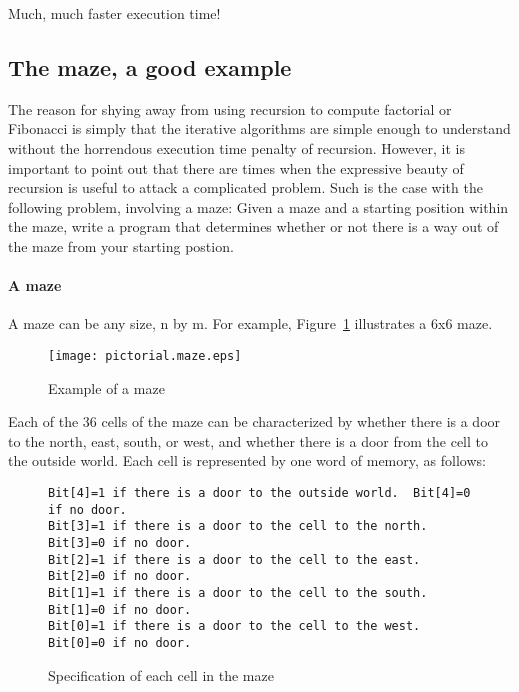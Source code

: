 \documentclass{patt}
\begin{document}
Much, much faster execution time!

\FloatBarrier
\subsection{The maze, a good example}

The reason for shying away from using recursion to compute factorial or 
Fibonacci is simply that the iterative algorithms are simple enough to
understand without the horrendous execution time penalty of recursion.
However, it is important to point out that there are times when the expressive
beauty of recursion is useful to attack a complicated problem.  Such is the
case with the following problem, involving a maze: Given a maze and a starting 
position within the maze, write a program that determines whether or not there 
is a way out of the maze from your starting postion.

\paragraph{A maze} 

A maze can be any size, n by m.  For example, Figure~\ref{fig:pictorial-maze}
illustrates a 6x6 maze.  

\begin{figure}[h]
\centerline{\texttt{[image: pictorial.maze.eps]}}
\caption{Example of a maze}
\label{fig:pictorial-maze}
\end{figure}

\noindent
Each of the 36 cells of the maze
can be characterized by whether there is a door to the north, east, 
south, or west, and whether there is a door from the cell to the outside 
world.  Each cell is represented by one word of memory, as follows:

\begin{figure}[h!]
\begin{minipage}{36pc}
\begin{Verbatim}[fontsize=\fontsize{9}{11}\selectfont]
Bit[4]=1 if there is a door to the outside world.  Bit[4]=0 if no door.
Bit[3]=1 if there is a door to the cell to the north.  Bit[3]=0 if no door.
Bit[2]=1 if there is a door to the cell to the east.  Bit[2]=0 if no door.
Bit[1]=1 if there is a door to the cell to the south.  Bit[1]=0 if no door.
Bit[0]=1 if there is a door to the cell to the west.  Bit[0]=0 if no door.
\end{Verbatim}
\caption{Specification of each cell in the maze}
\label{fig:cc}
\end{minipage}
\end{figure}
\end{document}
